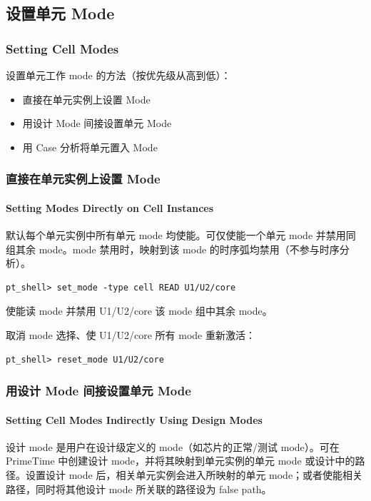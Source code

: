 \subsection{设置单元 Mode}
\subsubsection*{Setting Cell Modes}

设置单元工作 mode 的方法（按优先级从高到低）：
\begin{itemize}
  \item 直接在单元实例上设置 Mode
  \item 用设计 Mode 间接设置单元 Mode
  \item 用 Case 分析将单元置入 Mode
\end{itemize}

\subsubsection{直接在单元实例上设置 Mode}
\paragraph*{Setting Modes Directly on Cell Instances}

默认每个单元实例中所有单元 mode 均使能。可仅使能一个单元 mode 并禁用同组其余 mode。mode 禁用时，映射到该 mode 的时序弧均禁用（不参与时序分析）。

\begin{lstlisting}
pt_shell> set_mode -type cell READ U1/U2/core
\end{lstlisting}

使能读 mode 并禁用 U1/U2/core 该 mode 组中其余 mode。

取消 mode 选择、使 U1/U2/core 所有 mode 重新激活：
\begin{lstlisting}
pt_shell> reset_mode U1/U2/core
\end{lstlisting}

\subsubsection{用设计 Mode 间接设置单元 Mode}
\paragraph*{Setting Cell Modes Indirectly Using Design Modes}

设计 mode 是用户在设计级定义的 mode（如芯片的正常/测试 mode）。可在 PrimeTime 中创建设计 mode，并将其映射到单元实例的单元 mode 或设计中的路径。设置设计 mode 后，相关单元实例会进入所映射的单元 mode；或者使能相关路径，同时将其他设计 mode 所关联的路径设为 false path。

